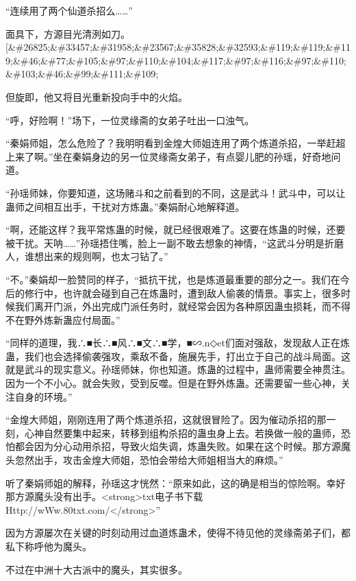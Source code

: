 
\begin{this_body}

“连续用了两个仙道杀招么……”

面具下，方源目光清洌如刀。[\&\#26825;\&\#33457;\&\#31958;\&\#23567;\&\#35828;\&\#32593;\&\#119;\&\#119;\&\#119;\&\#46;\&\#77;\&\#105;\&\#97;\&\#110;\&\#104;\&\#117;\&\#97;\&\#116;\&\#97;\&\#110;\&\#103;\&\#46;\&\#99;\&\#111;\&\#109;

但旋即，他又将目光重新投向手中的火焰。

“呼，好险啊！”场下，一位灵缘斋的女弟子吐出一口浊气。

“秦娟师姐，怎么危险了？我明明看到金煌大师姐连用了两个炼道杀招，一举赶超上来了啊。”坐在秦娟身边的另一位灵缘斋女弟子，有点婴儿肥的孙瑶，好奇地问道。

“孙瑶师妹，你要知道，这场赌斗和之前看到的不同，这是武斗！武斗中，可以让蛊师之间相互出手，干扰对方炼蛊。”秦娟耐心地解释道。

“啊，还能这样？我平常炼蛊的时候，就已经很艰难了。这要在炼蛊的时候，还要被干扰。天呐……”孙瑶捂住嘴，脸上一副不敢去想象的神情，“这武斗分明是折磨人，谁想出来的规则啊，也太刁钻了。”

“不。”秦娟却一脸赞同的样子，“抵抗干扰，也是炼道最重要的部分之一。我们在今后的修行中，也许就会碰到自己在炼蛊时，遭到敌人偷袭的情景。事实上，很多时候我们离开门派，外出完成门派任务时，就经常会因为各种原因蛊虫损耗，而不得不在野外炼新蛊应付局面。”

“同样的道理，我∴■长∴■风∴■文∴■学，■∽.n◇et们面对强敌，发现敌人正在炼蛊，我们也会选择偷袭强攻，乘敌不备，施展先手，打出立于自己的战斗局面。这就是武斗的现实意义。孙瑶师妹，你也知道。炼蛊的过程中，蛊师需要全神贯注。因为一个不小心。就会失败，受到反噬。但是在野外炼蛊。还需要留一些心神，关注自身的环境。”

“金煌大师姐，刚刚连用了两个炼道杀招，这就很冒险了。因为催动杀招的那一刻，心神自然要集中起来，转移到组构杀招的蛊虫身上去。若换做一般的蛊师，恐怕都会因为分心动用杀招，导致火焰失调，炼蛊失败。如果在这个时候。那方源魔头忽然出手，攻击金煌大师姐，恐怕会带给大师姐相当大的麻烦。”

听了秦娟师姐的解释，孙瑶这才恍然：“原来如此，这的确是相当的惊险啊。幸好那方源魔头没有出手。<strong>txt电子书下载Http://wWw.80txt.com/</strong>”

因为方源屡次在关键的时刻动用过血道炼蛊术，使得不待见他的灵缘斋弟子们，都私下称呼他为魔头。

不过在中洲十大古派中的魔头，其实很多。


\end{this_body}
